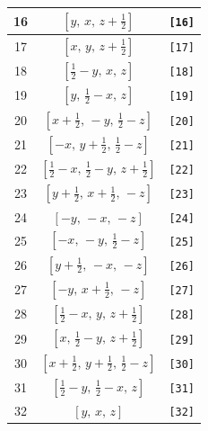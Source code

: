 \documentclass[fleqn,8pt]{jsarticle}
\begin{document}
\begin{longtable}{ccc}
16 & $\left[ y,\, x,\, z + \frac{1}{2} \right]$ & {\tt [16]} \\ \hline
17 & $\left[ x,\, y,\, z + \frac{1}{2} \right]$ & {\tt [17]} \\ \hline
18 & $\left[ \frac{1}{2} - y,\, x,\, z \right]$ & {\tt [18]} \\ \hline
19 & $\left[ y,\, \frac{1}{2} - x,\, z \right]$ & {\tt [19]} \\ \hline
20 & $\left[ x + \frac{1}{2},\, - y,\, \frac{1}{2} - z \right]$ & {\tt [20]} \\ \hline
21 & $\left[ - x,\, y + \frac{1}{2},\, \frac{1}{2} - z \right]$ & {\tt [21]} \\ \hline
22 & $\left[ \frac{1}{2} - x,\, \frac{1}{2} - y,\, z + \frac{1}{2} \right]$ & {\tt [22]} \\ \hline
23 & $\left[ y + \frac{1}{2},\, x + \frac{1}{2},\, - z \right]$ & {\tt [23]} \\ \hline
24 & $\left[ - y,\, - x,\, - z \right]$ & {\tt [24]} \\ \hline
25 & $\left[ - x,\, - y,\, \frac{1}{2} - z \right]$ & {\tt [25]} \\ \hline
26 & $\left[ y + \frac{1}{2},\, - x,\, - z \right]$ & {\tt [26]} \\ \hline
27 & $\left[ - y,\, x + \frac{1}{2},\, - z \right]$ & {\tt [27]} \\ \hline
28 & $\left[ \frac{1}{2} - x,\, y,\, z + \frac{1}{2} \right]$ & {\tt [28]} \\ \hline
29 & $\left[ x,\, \frac{1}{2} - y,\, z + \frac{1}{2} \right]$ & {\tt [29]} \\ \hline
30 & $\left[ x + \frac{1}{2},\, y + \frac{1}{2},\, \frac{1}{2} - z \right]$ & {\tt [30]} \\ \hline
31 & $\left[ \frac{1}{2} - y,\, \frac{1}{2} - x,\, z \right]$ & {\tt [31]} \\ \hline
32 & $\left[ y,\, x,\, z \right]$ & {\tt [32]} \\
\end{longtable}
\end{document}
